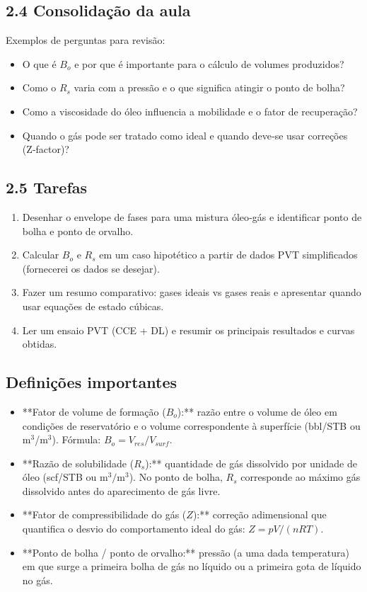 \documentclass[11pt,a4paper]{article}
\begin{document}
\subsection{2.4 Consolidação da aula}
Exemplos de perguntas para revisão:
\begin{itemize}
\item O que é $B_o$ e por que é importante para o cálculo de volumes produzidos?
\item Como o $R_s$ varia com a pressão e o que significa atingir o ponto de bolha?
\item Como a viscosidade do óleo influencia a mobilidade e o fator de recuperação?
\item Quando o gás pode ser tratado como ideal e quando deve‑se usar correções (Z‑factor)?
\end{itemize}

\subsection{2.5 Tarefas}
\begin{enumerate}
\item Desenhar o envelope de fases para uma mistura óleo‑gás e identificar ponto de bolha e ponto de orvalho.
\item Calcular $B_o$ e $R_s$ em um caso hipotético a partir de dados PVT simplificados (fornecerei os dados se desejar).
\item Fazer um resumo comparativo: gases ideais vs gases reais e apresentar quando usar equações de estado cúbicas.
\item Ler um ensaio PVT (CCE + DL) e resumir os principais resultados e curvas obtidas.
\end{enumerate}

\subsection{Definições importantes}
\begin{itemize}
\item **Fator de volume de formação ($B_o$):** razão entre o volume de óleo em condições de reservatório e o volume correspondente à superfície (bbl/STB ou m$^3$/m$^3$). Fórmula: $B_o = V_{res}/V_{surf}$.
\item **Razão de solubilidade ($R_s$):** quantidade de gás dissolvido por unidade de óleo (scf/STB ou $\mathrm{m}^3/\mathrm{m}^3$). No ponto de bolha, $R_s$ corresponde ao máximo gás dissolvido antes do aparecimento de gás livre.
\item **Fator de compressibilidade do gás ($Z$):** correção adimensional que quantifica o desvio do comportamento ideal do gás: $Z = pV/(nRT)$.
\item **Ponto de bolha / ponto de orvalho:** pressão (a uma dada temperatura) em que surge a primeira bolha de gás no líquido ou a primeira gota de líquido no gás.
\end{itemize}
\end{document}
